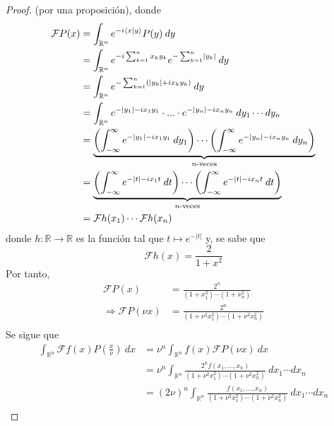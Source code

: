 \documentclass[12pt]{report}
\theoremstyle{largebreak}
\newcommand\abs[1]{\ensuremath{\left|#1\right|}}
\newcommand\cf[3]{\ensuremath{#1:#2\rightarrow#3}}
\newcommand\pint[2]{\ensuremath{\langle#1| #2\rangle}}
\newcommand{\fou}[1]{\ensuremath{\mathcal{F}#1}}
\begin{document}
\begin{proof}
        (por una proposición), donde
        \begin{equation*}
            \begin{split}
                \fou{P}(x)&=\int_{\mathbb{R}^n}e^{-i\pint{x}{y}}P(y)\:dy\\
                &=\int_{\mathbb{R}^n}e^{-i\sum_{ k=1}^n x_ky_k}e^{ -\sum_{ k=1}^n \abs{y_k}}\:dy\\
                &=\int_{\mathbb{R}^n}e^{-\sum_{ k=1}^n(\abs{y_k}+ix_ky_k)}\:dy\\
                &=\int_{\mathbb{R}^n}e^{-\abs{y_1}-ix_1y_1}\cdot...\cdot e^{-\abs{y_n}-ix_ny_n}\:dy_1\cdots dy_n\\
                &=\underbrace{\left(\int_{-\infty}^{\infty}e^{-\abs{y_1}-ix_1y_1}\:dy_1 \right)\cdots\left(\int_{-\infty}^{\infty}e^{-\abs{y_n}-ix_ny_n}\:dy_n \right)}_{ n\textup{-veces}}\\
                &=\underbrace{\left(\int_{-\infty}^{\infty}e^{-\abs{t}-ix_1t}\:dt \right)\cdots\left(\int_{-\infty}^{\infty}e^{-\abs{t}-ix_nt}\:dt \right)}_{ n\textup{-veces}}\\
                &=\fou{h}(x_1)\cdots\fou{h}(x_n)\\
            \end{split}
        \end{equation*}
        donde $\cf{h}{\mathbb{R}}{\mathbb{R}}$ es la función tal que $t\mapsto e^{-\abs{t}}$ y, se sabe que
        \begin{equation*}
            \fou{h}(x)=\frac{2}{1+x^2}
        \end{equation*}
        Por tanto,
        \begin{equation*}
            \begin{split}
                \fou{P}(x)&=\frac{2^n}{(1+x_1^2)\cdots(1+x_n^2)}\\
                \Rightarrow \fou{P}(\nu x)&=\frac{2^n}{(1+\nu^2x_1^2)\cdots(1+\nu^2x_n^2)}\\
            \end{split}
        \end{equation*}
        Se sigue que
        \begin{equation*}
            \begin{split}
                \int_{\mathbb{R}^n}\fou{f}(x)P\left(\frac{x}{\nu}\right)\:dx&=\nu^n\int_{\mathbb{R}^n}f(x)\fou{P}(\nu x)\:dx\\
                &=\nu^n\int_{\mathbb{R}^n}\frac{2^nf(x_1,...,x_n)}{(1+\nu^2x_1^2)\cdots(1+\nu^2x_n^2)}\:dx_1\cdots dx_n\\
                &=(2\nu)^n\int_{\mathbb{R}^n}\frac{f(x_1,...,x_n)}{(1+\nu^2x_1^2)\cdots(1+\nu^2x_n^2)}\:dx_1\cdots dx_n\\
            \end{split}
        \end{equation*}


\end{proof}
\end{document}

